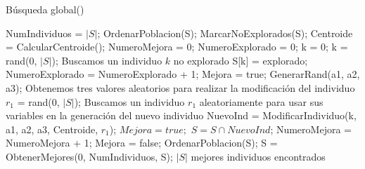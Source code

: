 

\begin{algorithm}[!ht]
  \caption{Búsqueda global(\mbox{})}
  \label{pseu:bg}
  \begin{algorithmic}[]
    \STATE NumIndividuos = $\left | S \right |$;
    \STATE OrdenarPoblacion(S);
    \STATE MarcarNoExplorados(S);
    \STATE Centroide = CalcularCentroide();
    \STATE NumeroMejora = 0;
    \STATE NumeroExplorado = 0;
      \STATE k = 0;
        \STATE k = rand(0, $\left | S \right |$); Buscamos un individuo $k$ no explorado
      \ENDWHILE
      \STATE S[k] = explorado;
      \STATE NumeroExplorado = NumeroExplorado + 1;
      \STATE Mejora = true;
          \STATE GenerarRand(a1, a2, a3); Obtenemos tres valores aleatorios para realizar la modificación del individuo
        \ENDWHILE
          \STATE $ r_{1}$ = rand(0, $\left | S \right |$); Buscamos un individuo $r_{1}$ aleatoriamente para usar sus variables en la generación del nuevo individuo
        \ENDWHILE
        \STATE NuevoInd = ModificarIndividuo(k, a1, a2, a3, Centroide, $r_{1}$);
          \STATE $Mejora = true;$
          \STATE $S = S \cap NuevoInd$;
          \STATE NumeroMejora = NumeroMejora + 1;
          \ELSE
            \STATE Mejora = false;
        \ENDIF
      \ENDWHILE
    \ENDWHILE
    \STATE OrdenarPoblacion(S); 
    \STATE S = ObtenerMejores(0, NumIndividuos, S);
    \RETURN $\left | S \right |$ mejores individuos encontrados
  \end{algorithmic}
\end{algorithm}
